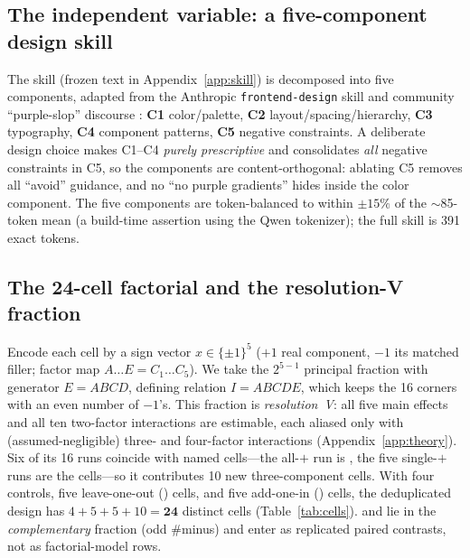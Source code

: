 \subsection{The independent variable: a five-component design skill}
The skill (frozen text in Appendix~\ref{app:skill}) is decomposed into five components, adapted
from the Anthropic \texttt{frontend-design} skill and community ``purple-slop'' discourse
\citep{anthropic2025frontendskill}: \textbf{C1} color/palette, \textbf{C2}
layout/spacing/hierarchy, \textbf{C3} typography, \textbf{C4} component patterns, \textbf{C5}
negative constraints. A deliberate design choice makes C1--C4 \emph{purely prescriptive} and
consolidates \emph{all} negative constraints in C5, so the components are content-orthogonal:
ablating C5 removes all ``avoid'' guidance, and no ``no purple gradients'' hides inside the
color component. The five components are token-balanced to within $\pm15\%$ of the $\sim$85-token
mean (a build-time assertion using the Qwen tokenizer); the full skill is 391 exact tokens.

\subsection{The 24-cell factorial and the resolution-V fraction}
\label{sec:cells}
Encode each cell by a sign vector $x\in\{\pm1\}^5$ ($+1$ real component, $-1$ its matched
filler; factor map $A\!\dots\!E=C_1\!\dots\!C_5$). We take the $2^{5-1}$ principal fraction with
generator $E{=}ABCD$, defining relation $I{=}ABCDE$, which keeps the 16 corners with an even
number of $-1$'s. This fraction is \emph{resolution~V}: all five main effects and all ten
two-factor interactions are estimable, each aliased only with (assumed-negligible) three- and
four-factor interactions (Appendix~\ref{app:theory}). Six of its 16 runs coincide with named
cells---the all-$+$ run is \FULL, the five single-$+$ runs are the \AOI{} cells---so it
contributes 10 new three-component cells. With four controls, five leave-one-out (\LOO) cells,
and five add-one-in (\AOI) cells, the deduplicated design has $4+5+5+10=\mathbf{24}$ distinct
cells (Table~\ref{tab:cells}). \LOO{} and \NEUTRAL{} lie in the \emph{complementary} fraction
(odd $\#$minus) and enter as replicated paired contrasts, not as factorial-model rows.

